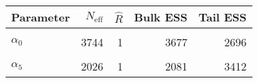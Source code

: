 \begin{table}[!h]
\centering
\begin{tabular}{>{\raggedright\arraybackslash}p{2cm}rrrr}
\toprule
Parameter & $N_{\text{eff}}$ & $\widehat{R}$ & Bulk ESS & Tail ESS\\
\midrule
\cellcolor{gray!6}{$\rho$} & \cellcolor{gray!6}{40058} & \cellcolor{gray!6}{1} & \cellcolor{gray!6}{40160} & \cellcolor{gray!6}{41549}\\
$\alpha_{0}$ & 3744 & 1 & 3677 & 2696\\
\cellcolor{gray!6}{$\alpha_{2}$} & \cellcolor{gray!6}{4097} & \cellcolor{gray!6}{1} & \cellcolor{gray!6}{4078} & \cellcolor{gray!6}{3544}\\
$\alpha_{5}$ & 2026 & 1 & 2081 & 3412\\
\bottomrule
\end{tabular}
\end{table}